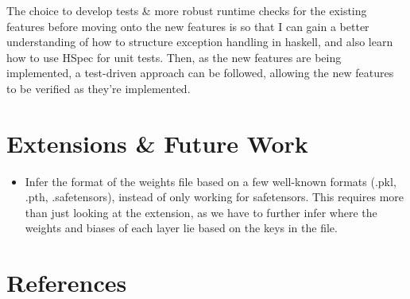 \documentclass[12pt, titlepage]{article}
\begin{document}
The choice to develop tests \& more robust runtime checks for the existing features before moving onto the new features is so that I can gain a better understanding of how to structure exception handling in haskell, and also learn how to use HSpec for unit tests. Then, as the new features are being implemented, a test-driven approach can be followed, allowing the new features to be verified as they're implemented.

\section{Extensions \& Future Work}
\begin{itemize}
	\item Infer the format of the weights file based on a few well-known formats (.pkl, .pth, .safetensors), instead of only working for safetensors. This requires more than just looking at the extension, as we have to further infer where the weights and biases of each layer lie based on the keys in the file. 
\end{itemize}

\section{References}
\end{document}
